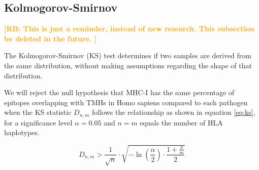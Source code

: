 \documentclass{article}
\newcommand{\richel}[1]{\textcolor{orange}{\textbf{[RB: #1]}}}
\begin{document}
\subsection{Kolmogorov-Smirnov}

\richel{
  This is just a reminder, instead of new research. 
  This subsection be deleted in the future.
}

The Kolmogorov-Smirnov (KS) test determines if two samples
are derived from the same distribution, without making assumptions
regarding the shape of that distribution. 

We will reject
the null hypothesis that MHC-I has the same percentage of epitopes 
overlapping with TMHs in Homo sapiens compared to each pathogen when 
the KS statistic $D_{n,m}$ follows the relationship as shown in 
equation \ref{eq:ks}, for a significance level $\alpha = 0.05$
and $n = m$ equals the number of HLA haplotypes.

\begin{equation}
   D_{n,m} > \frac{1}{\sqrt{n}} \cdot \sqrt{ -\ln(\frac{\alpha}{2}) \cdot \frac{1 + \frac{n}{m}}{2} }
   \label{eq:ks}
\end{equation}
\end{document}

